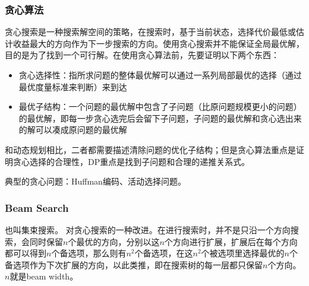\subsubsection{贪心算法}
贪心搜索是一种搜索解空间的策略，在搜索时，基于当前状态，选择代价最低或估计收益最大的方向作为下一步搜索的方向。使用贪心搜索并不能保证全局最优解，目的是为了找到一个可行解。在使用贪心算法前，先要证明以下两个东西：
\begin{itemize}
	\item 贪心选择性：指所求问题的整体最优解可以通过一系列局部最优的选择（通过最优度量标准来判断）来到达
	\item 最优子结构：一个问题的最优解中包含了子问题（比原问题规模更小的问题）的最优解，即每一步贪心选完后会留下子问题，子问题的最优解和贪心选出来的解可以凑成原问题的最优解
\end{itemize}
和动态规划相比，二者都需要描述清除问题的优化子结构；但是贪心算法重点是证明贪心选择的合理性，DP重点是找到子问题和合理的递推关系式。

典型的贪心问题：Huffman编码、活动选择问题。



\subsubsection{Beam Search}
也叫集束搜索。
对贪心搜索的一种改进。在进行搜索时，并不是只沿一个方向搜索，会同时保留$n$个最优的方向，分别以这$n$个方向进行扩展，扩展后在每个方向都可以得到$n$个备选项，那么则有$n^2$个备选项，在这$n^2$个被选项里选择最优的$n$个备选项作为下次扩展的方向，以此类推，即在搜索树的每一层都只保留$n$个方向。$n$就是beam width。


